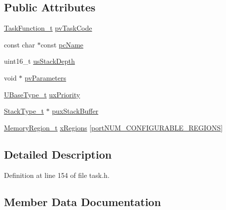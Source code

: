 \subsection*{Public Attributes}
\begin{DoxyCompactItemize}
\item 
\hyperlink{projdefs_8h_a9b32502ff92c255c686dacde53c1cba0}{Task\+Function\+\_\+t} \hyperlink{structx_t_a_s_k___p_a_r_a_m_e_t_e_r_s_a7527993402054565cda38251c8922880}{pv\+Task\+Code}
\item 
const char $\ast$const \hyperlink{structx_t_a_s_k___p_a_r_a_m_e_t_e_r_s_a7b3e5583acf9de8bacac572a42246459}{pc\+Name}
\item 
uint16\+\_\+t \hyperlink{structx_t_a_s_k___p_a_r_a_m_e_t_e_r_s_aa07bfb2214d78ba7a30592fa7b75af18}{us\+Stack\+Depth}
\item 
void $\ast$ \hyperlink{structx_t_a_s_k___p_a_r_a_m_e_t_e_r_s_accbb9f4de75b5b5be750198b52390c7f}{pv\+Parameters}
\item 
\hyperlink{portmacro_8h_a646f89d4298e4f5afd522202b11cb2e6}{U\+Base\+Type\+\_\+t} \hyperlink{structx_t_a_s_k___p_a_r_a_m_e_t_e_r_s_aa1aff14035db645e2bdcc85b3cdc9bab}{ux\+Priority}
\item 
\hyperlink{portmacro_8h_a84e9a8ba132feed0b2401c1f4e2ac63c}{Stack\+Type\+\_\+t} $\ast$ \hyperlink{structx_t_a_s_k___p_a_r_a_m_e_t_e_r_s_a946c525d3765369780538f9bc3f3586d}{pux\+Stack\+Buffer}
\item 
\hyperlink{task_8h_af609504de4d78ff6f71477ae47c66e51}{Memory\+Region\+\_\+t} \hyperlink{structx_t_a_s_k___p_a_r_a_m_e_t_e_r_s_ae8b97c6b7a344bf09b066b0844844d66}{x\+Regions} \mbox{[}\hyperlink{portable_8h_aca7e1a8a568a38b74cc9db10c8efebda}{port\+N\+U\+M\+\_\+\+C\+O\+N\+F\+I\+G\+U\+R\+A\+B\+L\+E\+\_\+\+R\+E\+G\+I\+O\+NS}\mbox{]}
\end{DoxyCompactItemize}


\subsection{Detailed Description}


Definition at line 154 of file task.\+h.



\subsection{Member Data Documentation}
